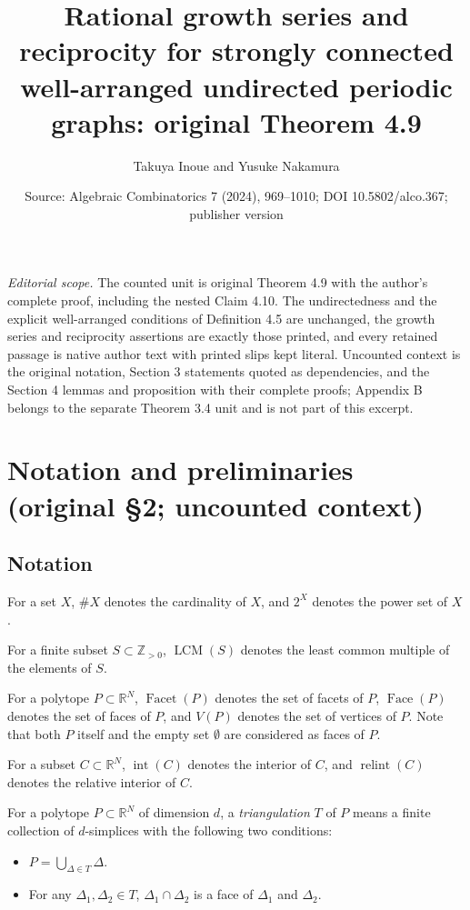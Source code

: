 \documentclass[10pt,a4paper]{amsart}
\title[Rational growth series and reciprocity for well-arranged periodic graphs]{Rational growth series and reciprocity for strongly connected well-arranged undirected periodic graphs: original Theorem 4.9}
\author{Takuya Inoue and Yusuke Nakamura}
\date{Source: Algebraic Combinatorics 7 (2024), 969--1010; DOI 10.5802/alco.367; publisher version}
\theoremstyle{plain}
\theoremstyle{definition}
\theoremstyle{remark}
\begin{document}
\maketitle
\noindent\textit{Editorial scope.} The counted unit is original Theorem 4.9 with the author's complete proof, including the nested Claim 4.10. The undirectedness and the explicit well-arranged conditions of Definition 4.5 are unchanged, the growth series and reciprocity assertions are exactly those printed, and every retained passage is native author text with printed slips kept literal. Uncounted context is the original notation, Section 3 statements quoted as dependencies, and the Section 4 lemmas and proposition with their complete proofs; Appendix B belongs to the separate Theorem 3.4 unit and is not part of this excerpt.
\setcounter{section}{1}
\section{Notation and preliminaries (original \S2; uncounted context)}
\subsection{Notation}
For a set $X$, $\# X$ denotes the cardinality of $X$, 
and $2 ^X$ denotes the power set of $X$. 

For a finite subset $S \subset \mathbb{Z}_{>0}$, $\operatorname{LCM}(S)$ denotes the least common multiple of the elements of $S$. 

For a polytope $P \subset \mathbb{R}^N$, 
$\operatorname{Facet}(P)$ denotes the set of facets of $P$, 
$\operatorname{Face}(P)$ denotes the set of faces of $P$, and 
$V(P)$ denotes the set of vertices of $P$. 
Note that both $P$ itself and the empty set $\emptyset$ are considered as faces of $P$. 

For a subset $C \subset \mathbb{R}^N$, 
$\operatorname{int}(C)$ denotes the interior of $C$, and 
$\operatorname{relint}(C)$ denotes the relative interior of $C$. 

For a polytope $P \subset \mathbb{R}^N$ of dimension $d$, 
a \textit{triangulation} $T$ of $P$ means a finite collection of $d$-simplices with the following two conditions: 
\begin{itemize}
\item $P = \bigcup _{\Delta \in T} \Delta$. 
\item For any $\Delta _1, \Delta _2 \in T$, $\Delta _1 \cap \Delta _2$ is a face of $\Delta _1$ and $\Delta _2$. 
\end{itemize}
\end{document}
